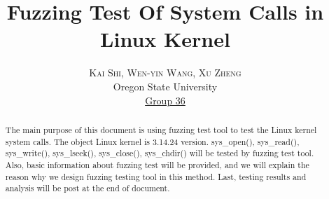 \documentclass[twoside]{article}
\title{\vspace{-15mm}\fontsize{24pt}{10pt}\selectfont\textbf{Fuzzing Test Of System Calls in Linux Kernel}
} %
\author{
\large
\textsc{Kai Shi, Wen-yin Wang, Xu Zheng}\\ %
\normalsize Oregon State University \\ %
\normalsize \href{Kai Shi:shik@onid.oregonstate.edu, Wen-yin Wang: wangweny@onid.oregonstate.edu, Xu Zheng: zhengxu@onid.oregonstate.edu}{Group 36} %
\vspace{-2mm}
}
\date{}
\begin{document}
\maketitle %

\thispagestyle{fancy} %
\begin{abstract}
The main purpose of this document is using fuzzing test tool to test the Linux kernel system calls. The object Linux kernel is 3.14.24 version. sys\_open(),  sys\_read(), sys\_write(), sys\_lseek(), sys\_close(), sys\_chdir() will be tested by fuzzing test tool. Also, basic information about fuzzing test will be provided, and we will explain the reason why we design fuzzing testing tool in this method. Last, testing results and analysis will be post at the end of document. 

\end{abstract}

\end{document}
